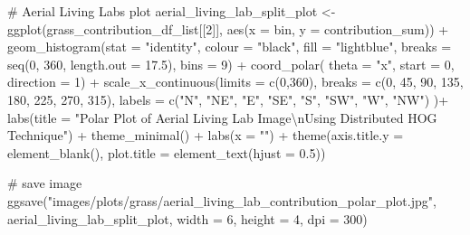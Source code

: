 \documentclass[
  letterpaper,
  DIV=11,
  numbers=noendperiod]{scrreprt}
\newenvironment{Shaded}{\begin{snugshade}}{\end{snugshade}}
\newcommand{\AttributeTok}[1]{\textcolor[rgb]{0.40,0.45,0.13}{#1}}
\newcommand{\CommentTok}[1]{\textcolor[rgb]{0.37,0.37,0.37}{#1}}
\newcommand{\DecValTok}[1]{\textcolor[rgb]{0.68,0.00,0.00}{#1}}
\newcommand{\FloatTok}[1]{\textcolor[rgb]{0.68,0.00,0.00}{#1}}
\newcommand{\FunctionTok}[1]{\textcolor[rgb]{0.28,0.35,0.67}{#1}}
\newcommand{\NormalTok}[1]{\textcolor[rgb]{0.00,0.23,0.31}{#1}}
\newcommand{\OtherTok}[1]{\textcolor[rgb]{0.00,0.23,0.31}{#1}}
\newcommand{\SpecialCharTok}[1]{\textcolor[rgb]{0.37,0.37,0.37}{#1}}
\newcommand{\StringTok}[1]{\textcolor[rgb]{0.13,0.47,0.30}{#1}}
\begin{document}
\begin{Shaded}
\begin{Highlighting}[]
\CommentTok{\# Aerial Living Labs plot}
\NormalTok{aerial\_living\_lab\_split\_plot }\OtherTok{\textless{}{-}}
  \FunctionTok{ggplot}\NormalTok{(grass\_contribution\_df\_list[[}\DecValTok{2}\NormalTok{]], }
         \FunctionTok{aes}\NormalTok{(}\AttributeTok{x =}\NormalTok{ bin, }\AttributeTok{y =}\NormalTok{ contribution\_sum)) }\SpecialCharTok{+}
  \FunctionTok{geom\_histogram}\NormalTok{(}\AttributeTok{stat =} \StringTok{"identity"}\NormalTok{,}
                 \AttributeTok{colour =} \StringTok{"black"}\NormalTok{, }
                 \AttributeTok{fill =} \StringTok{"lightblue"}\NormalTok{, }
                 \AttributeTok{breaks =} \FunctionTok{seq}\NormalTok{(}\DecValTok{0}\NormalTok{, }\DecValTok{360}\NormalTok{, }\AttributeTok{length.out =} \FloatTok{17.5}\NormalTok{),}
                 \AttributeTok{bins =} \DecValTok{9}\NormalTok{) }\SpecialCharTok{+}
  \FunctionTok{coord\_polar}\NormalTok{(}
    \AttributeTok{theta =} \StringTok{"x"}\NormalTok{, }
    \AttributeTok{start =} \DecValTok{0}\NormalTok{, }
    \AttributeTok{direction =} \DecValTok{1}\NormalTok{) }\SpecialCharTok{+}
  \FunctionTok{scale\_x\_continuous}\NormalTok{(}\AttributeTok{limits =} \FunctionTok{c}\NormalTok{(}\DecValTok{0}\NormalTok{,}\DecValTok{360}\NormalTok{),}
    \AttributeTok{breaks =} \FunctionTok{c}\NormalTok{(}\DecValTok{0}\NormalTok{, }\DecValTok{45}\NormalTok{, }\DecValTok{90}\NormalTok{, }\DecValTok{135}\NormalTok{, }\DecValTok{180}\NormalTok{, }\DecValTok{225}\NormalTok{, }\DecValTok{270}\NormalTok{, }\DecValTok{315}\NormalTok{), }
    \AttributeTok{labels =} \FunctionTok{c}\NormalTok{(}\StringTok{"N"}\NormalTok{, }\StringTok{"NE"}\NormalTok{, }\StringTok{"E"}\NormalTok{, }\StringTok{"SE"}\NormalTok{, }\StringTok{"S"}\NormalTok{, }\StringTok{"SW"}\NormalTok{, }\StringTok{"W"}\NormalTok{, }\StringTok{"NW"}\NormalTok{)}
\NormalTok{  )}\SpecialCharTok{+}
  \FunctionTok{labs}\NormalTok{(}\AttributeTok{title =} \StringTok{"Polar Plot of Aerial Living Lab Image}\SpecialCharTok{\textbackslash{}n}\StringTok{Using Distributed HOG Technique"}\NormalTok{) }\SpecialCharTok{+}
  \FunctionTok{theme\_minimal}\NormalTok{() }\SpecialCharTok{+}
  \FunctionTok{labs}\NormalTok{(}\AttributeTok{x =} \StringTok{""}\NormalTok{) }\SpecialCharTok{+}
  \FunctionTok{theme}\NormalTok{(}\AttributeTok{axis.title.y =} \FunctionTok{element\_blank}\NormalTok{(),}
        \AttributeTok{plot.title =} \FunctionTok{element\_text}\NormalTok{(}\AttributeTok{hjust =} \FloatTok{0.5}\NormalTok{))}

\CommentTok{\# save image}
\FunctionTok{ggsave}\NormalTok{(}\StringTok{"images/plots/grass/aerial\_living\_lab\_contribution\_polar\_plot.jpg"}\NormalTok{, aerial\_living\_lab\_split\_plot, }\AttributeTok{width =} \DecValTok{6}\NormalTok{, }\AttributeTok{height =} \DecValTok{4}\NormalTok{, }\AttributeTok{dpi =} \DecValTok{300}\NormalTok{)}
\end{Highlighting}
\end{Shaded}
\end{document}
